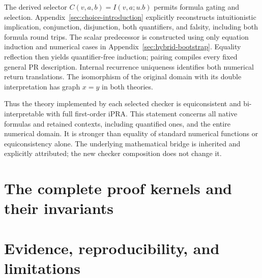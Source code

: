 \documentclass[11pt]{article}
\theoremstyle{definition}\newtheorem{definition}[theorem]{Definition}
\begin{document}
The derived selector $C(v,a,b)=I(v,a;u.b)$ permits formula gating and
selection. Appendix~\ref{sec:choice-introduction} explicitly reconstructs
intuitionistic implication, conjunction, disjunction, both quantifiers,
and falsity, including both formula round trips. The scalar predecessor
is constructed using only equation induction and numerical cases in
Appendix~\ref{sec:hybrid-bootstrap}. Equality reflection then yields
quantifier-free induction; pairing compiles every fixed general PR
description. Internal recurrence uniqueness identifies both numerical
return translations. The isomorphism of the original domain with its
double interpretation has graph $x=y$ in both theories.

Thus the theory implemented by each selected checker is equiconsistent
and bi-interpretable with full first-order iPRA. This statement concerns
all native formulas and retained contexts, including quantified ones,
and the entire numerical domain. It is stronger than equality of standard
numerical functions or equiconsistency alone. The underlying mathematical
bridge is inherited and explicitly attributed; the new checker composition
does not change it.




\section{The complete proof kernels and their invariants}
\label{sec:kernel}


\section{Evidence, reproducibility, and limitations}
\label{sec:evidence}

\end{document}
